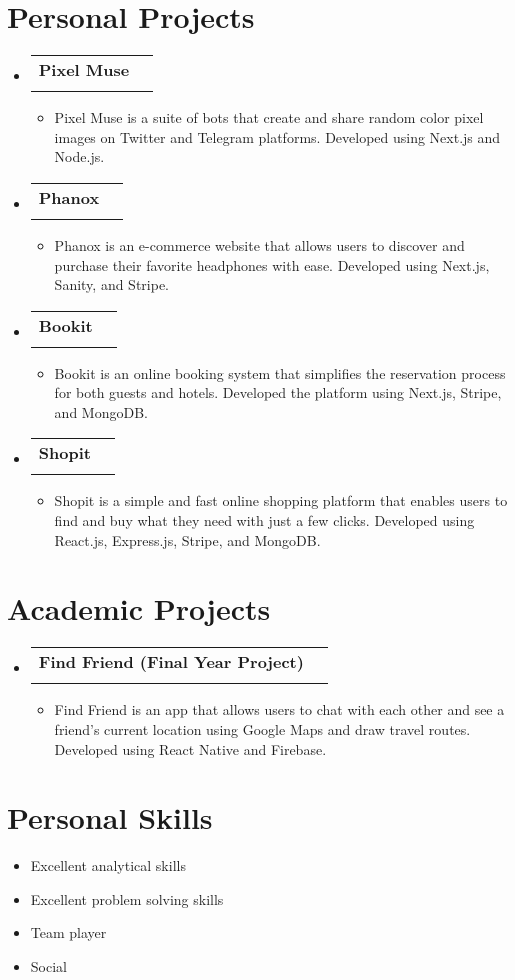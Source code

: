 \documentclass[letterpaper,11pt]{article}
\makeatletter
\newcommand{\resumeItem}[1]{
  \item\small{
    {#1 \vspace{-2pt}}
  }
}
\newcommand{\resumeSubheading}[4]{
  \vspace{-1pt}\item
    \begin{tabular*}{0.97\textwidth}[t]{l@{\extracolsep{\fill}}r}
      \textbf{#1} & #2 \\
      \textit{\small#3} & \textit{\small #4} \\
    \end{tabular*}\vspace{-6pt}
}
\newcommand{\resumeSubHeadingListStart}{\begin{itemize}[leftmargin=0.15in, label={}]}
\newcommand{\resumeSubHeadingListEnd}{\end{itemize}}
\newcommand{\resumeItemListStart}{\begin{itemize}}
\newcommand{\resumeItemListEnd}{\end{itemize}\vspace{-4pt}}
\makeatother
\begin{document}
\section{Personal Projects}
  \resumeSubHeadingListStart
    \resumeSubheading
    {Pixel Muse}{}{}{}\vspace{-12pt}
      \resumeItemListStart
        \resumeItem{Pixel Muse is a suite of bots that create and share random color pixel images on Twitter and Telegram platforms. Developed using Next.js and Node.js.}
    \resumeItemListEnd
    \resumeSubheading
    {Phanox}{}{}{}\vspace{-12pt}
      \resumeItemListStart
        \resumeItem{Phanox is an e-commerce website that allows users to discover and purchase their favorite headphones with ease. Developed using Next.js, Sanity, and Stripe.}
    \resumeItemListEnd
      \resumeSubheading
      {Bookit}{}{}{}\vspace{-12pt}
      \resumeItemListStart
        \resumeItem{Bookit is an online booking system that simplifies the reservation process for both guests and hotels. Developed the platform using Next.js, Stripe, and MongoDB.}
    \resumeItemListEnd
    \resumeSubheading
    {Shopit}{}{}{}\vspace{-12pt}
      \resumeItemListStart
        \resumeItem{Shopit is a simple and fast online shopping platform that enables users to find and buy what they need with just a few clicks. Developed using React.js, Express.js, Stripe, and MongoDB.}
    \resumeItemListEnd
  \resumeSubHeadingListEnd

\section{Academic Projects}
  \resumeSubHeadingListStart
      \resumeSubheading
      {Find Friend (Final Year Project)}{}{}{}\vspace{-12pt}
      \resumeItemListStart
        \resumeItem{Find Friend is an app that allows users to chat with each other and see a friend’s current location using Google Maps and draw travel routes. Developed using React Native and Firebase.}
    \resumeItemListEnd
  \resumeSubHeadingListEnd

\section{Personal Skills}
      \resumeItemListStart
        \resumeItem{Excellent analytical skills}
        \resumeItem{Excellent problem solving skills}
        \resumeItem{Team player}
        \resumeItem{Social}\vspace{-10pt}
    \resumeItemListEnd
\end{document}
